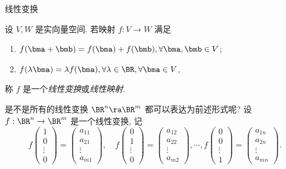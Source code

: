 \begin{frame}{线性变换\noexer}
	\onslide<+->
	\begin{definition}
		设 $V,W$ 是实向量空间.
		若映射 $f:V\to W$ 满足
		\begin{enumerate}[<*>]
			\item $f(\bma+\bmb)=f(\bma)+f(\bmb),\forall \bma,\bmb\in V$;
			\item $f(\lambda \bma)=\lambda f(\bma),\forall \lambda\in\BR,\forall\bma\in V$,
		\end{enumerate}
		称 $f$ 是一个\emph{线性变换}或\emph{线性映射}.
	\end{definition}
	\onslide<+->
	是不是所有的线性变换 $\BR^n\ra\BR^m$ 都可以表达为前述形式呢?
	\onslide<+->
	设 $f:\BR^n\to\BR^m$ 是一个线性变换,
	\onslide<+->
	记
	\[f\begin{pmatrix}
		1\\0\\\vdots\\0
	\end{pmatrix}=\begin{pmatrix}
		a_{11}\\a_{21}\\\vdots\\a_{m1}
	\end{pmatrix},\quad
	f\begin{pmatrix}
		0\\1\\\vdots\\0
	\end{pmatrix}=\begin{pmatrix}
		a_{12}\\a_{22}\\\vdots\\a_{m2}
	\end{pmatrix},\cdots,
	f\begin{pmatrix}
		0\\0\\\vdots\\1
	\end{pmatrix}=\begin{pmatrix}
		a_{1n}\\a_{2n}\\\vdots\\a_{mn}
	\end{pmatrix}.\]
\end{frame}


